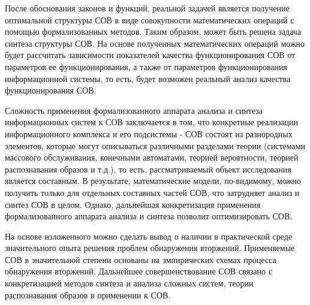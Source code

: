 После обоснования законов и функций, реальной задачей является получение оптимальной структуры СОВ в виде совокупности математических операций с помощью формализованных методов. Таким образом, может быть решена задача синтеза структуры СОВ. На основе полученных математических операций можно будет рассчитать зависимости показателей качества функционирования СОВ от параметров ее функционирования, а также от параметров функционирования информационной системы, то есть, будет возможен реальный анализ качества функционирования СОВ.

Сложность применения формализованного аппарата анализа и синтеза информационных систем к СОВ заключается в том, что конкретные реализации информационного комплекса и его подсистемы - СОВ состоят из разнородных элементов, которые могут описываться различными разделами теории (системами массового обслуживания, конечными автоматами, теорией вероятности, теорией распознавания образов и т.д.), то есть, рассматриваемый объект исследования является составным. В результате, математические модели, по-видимому, можно получить только для отдельных составных частей СОВ, что затрудняет анализ и синтез СОВ в целом. Однако, дальнейшая конкретизация применения формализованного аппарата анализа и синтеза позволит оптимизировать СОВ.

На основе изложенного можно сделать вывод о наличии в практической среде значительного опыта решения проблем обнаружения вторжений. Применяемые СОВ в значительной степени основаны на эмпирических схемах процесса обнаружения вторжений. Дальнейшее совершенствование СОВ связано с конкретизацией методов синтеза и анализа сложных систем, теории распознавания образов в применении к СОВ.